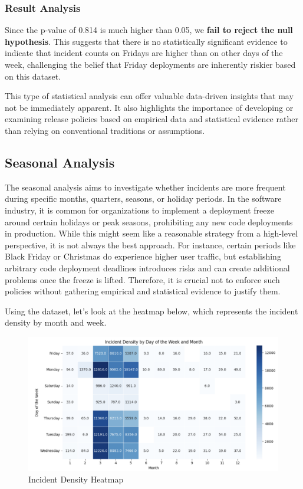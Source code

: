 \documentclass{article}
\begin{document}
\subsubsection{Result Analysis}

Since the p-value of 0.814 is much higher than 0.05, we \textbf{fail to reject the null hypothesis}. This suggests that there is no statistically significant evidence to indicate that incident counts on Fridays are higher than on other days of the week, challenging the belief that Friday deployments are inherently riskier based on this dataset. 

This type of statistical analysis can offer valuable data-driven insights that may not be immediately apparent. It also highlights the importance of developing or examining release policies based on empirical data and statistical evidence rather than relying on conventional traditions or assumptions.

\subsection{Seasonal Analysis}

The seasonal analysis aims to investigate whether incidents are more frequent during specific months, quarters, seasons, or holiday periods. In the software industry, it is common for organizations to implement a deployment freeze around certain holidays or peak seasons, prohibiting any new code deployments in production. While this might seem like a reasonable strategy from a high-level perspective, it is not always the best approach. For instance, certain periods like Black Friday or Christmas do experience higher user traffic, but establishing arbitrary code deployment deadlines introduces risks and can create additional problems once the freeze is lifted. Therefore, it is crucial not to enforce such policies without gathering empirical and statistical evidence to justify them.

Using the dataset, let's look at the heatmap below, which represents the incident density by month and week. 

\begin{figure}[H]
    \centering
    \includegraphics[width=0.7\linewidth]{Screenshot 2024-10-01 233549.png}
    \caption{Incident Density Heatmap}
    \label{fig:enter-label}
\end{figure}
\end{document}
